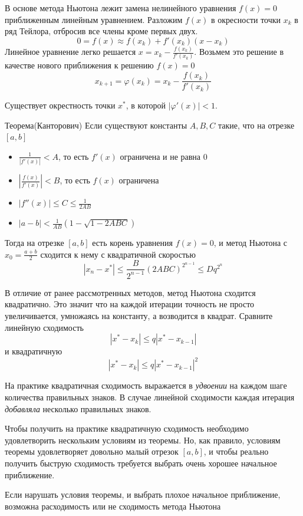 \documentclass[professionalfonts,compress,unicode]{beamer}
\begin{document}
{
	В основе метода Ньютона лежит замена нелинейного уравнения $f(x) = 0$ приближенным линейным уравнением.
	Разложим $f(x)$ в окресности точки $x_k$ в ряд Тейлора, отбросив все члены кроме первых двух.
	$$
	0 = f(x) \approx f(x_k) + f'(x_k)(x - x_k) 
	$$
	Линейное уравнение легко решается $x = x_k - \frac{f(x_k)}{f'(x_k)}$. Возьмем это решение в качестве нового приближения к решению $f(x) = 0$
	$$
	x_{k+1} = \varphi(x_k) = x_k - \frac{f(x_k)}{f'(x_k)}
	$$
}

{
	Существует окрестность точки $x^*$, в которой $|\varphi'(x)| < 1$.
	\begin{block}{Теорема(Канторович)}
		Если существуют константы $A,B,C$ такие, что на отрезке $[a,b]$
		\begin{itemize}
			\item $\frac{1}{|f'(x)|} < A$, то есть $f'(x)$ ограничена и не равна $0$
			\item $|\frac{f(x)}{f'(x)}| < B$, то есть $f(x)$ ограничена
			\item $|f''(x)| \leq C \leq \frac{1}{2AB}$
			\item $|a-b| < \frac{1}{AB}\left(1-\sqrt{1-2ABC}\right)$
		\end{itemize}
		Тогда на отрезке $[a,b]$ есть корень уравнения $f(x) = 0$, и метод Ньютона с $x_0 = \frac{a+b}{2}$ сходится к нему с квадратичной скоростью
		$$
		|x_n - x^*| \leq \frac{B}{2^{n-1}} (2ABC)^{2^{n-1}} \leq D q^{2^n}
		$$
	\end{block}
}

{
	В отличие от ранее рассмотренных методов, метод Ньютона сходится квадратично. Это значит что на каждой итерации точность не просто увеличивается, умножаясь на константу,
	а возводится в квадрат.
	Сравните линейную сходимость
	$$
	|x^* - x_k| \leq q |x^* - x_{k-1}|
	$$
	и квадратичную
	$$
	|x^* - x_k| \leq q |x^* - x_{k-1}|^2
	$$
	
	На практике квадратичная сходимость выражается в \emph{удвоении} на каждом шаге количества правильных знаков. 
	В случае линейной сходимости каждая итерация \emph{добавляла} несколько правильных знаков.
}

{
	Чтобы получить на практике квадратичную сходимость необходимо удовлетворить нескольким условиям из теоремы. 
	Но, как правило, условиям теоремы удовлетворяет довольно малый отрезок $[a,b]$, и чтобы реально получить быструю сходимость
	требуется выбрать очень хорошее начальное приближение.
	
	Если нарушать условия теоремы, и выбрать плохое начальное приближение, возможна расходимость или не сходимость метода Ньютона
}
\end{document}
